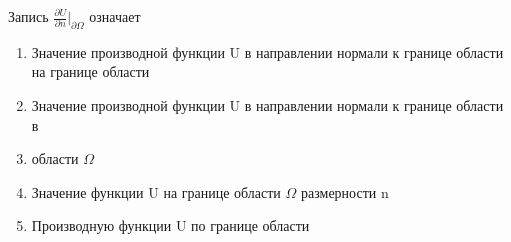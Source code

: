 Запись \(\frac{\partial U}{\partial n}\vert _{\partial \Omega }\) означает

\begin{enumerate}[label=\arabic*)]
    \item Значение производной функции U в направлении нормали к границе области на границе области
    \item Значение производной функции U в направлении нормали к границе области в
    \item области \(\Omega\)
    \item Значение функции U на границе области \(\Omega\) размерности n
    \item Производную функции U по границе области
\end{enumerate}

